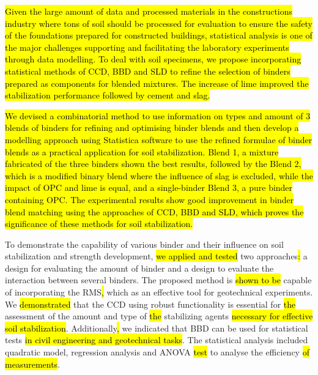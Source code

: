 \documentclass[eprint,
]{actapoly}
\begin{document}
\hl{Given the large amount of data and processed materials in the constructions industry where tons of soil should be processed for evaluation to ensure the safety of the foundations prepared for constructed buildings, statistical analysis is one of the major challenges supporting and facilitating the laboratory experiments through data modelling. To deal with soil specimens, we propose incorporating statistical methods of CCD, BBD and SLD to refine the selection of binders prepared as components for blended mixtures. The increase of lime improved the stabilization performance followed by cement and slag. } 

\hl{ We devised a combinatorial method to use information on types and amount of 3 blends of binders for refining and optimising binder blends and then develop a modelling approach using Statistica software to use the refined formulae of binder blends as a practical application for soil stabilization. Blend 1, a mixture fabricated of the three binders shown the best results, followed by the Blend 2, which is a modified binary blend where the influence of slag is excluded, while the impact of OPC and lime is equal, and a single-binder Blend 3, a pure binder containing OPC. The experimental results show good improvement in binder blend matching using the approaches of CCD, BBD and SLD, which proves the significance of these methods for soil stabilization.}

To demonstrate the capability of various binder and their influence on soil stabilization and strength development, \hl{we applied and tested }two approaches\hl{: }a design for evaluating the amount of binder and a design to evaluate the interaction between several binders. The proposed method is \hl{shown to be }capable of incorporating the RMS\hl{, }which as an effective tool for geotechnical experiments. We \hl{demonstrated }that the CCD using\hl{ }robust functionality is essential for \hl{the }assessment of the amount and type of \hl{the }stabilizing agents \hl{necessary for effective soil stabilization}. Additionally\hl{, }we indicated that BBD can be used for statistical tests \hl{in civil engineering and geotechnical tasks}. The statistical analysis included quadratic model, regression analysis and ANOVA \hl{test} to analyse the efficiency \hl{of measurements}.
\end{document}
